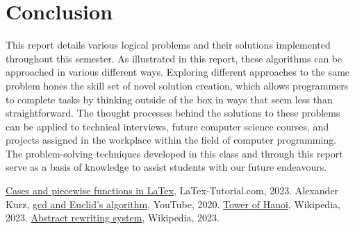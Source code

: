 \documentclass{article}
\theoremstyle{theorem}
\theoremstyle{definition}
\theoremstyle{remark}
\begin{document}
\section{Conclusion}\label{conclusions}

This report details various logical problems and their solutions implemented throughout this semester. As illustrated in this report, these algorithms can be approached in various different ways. Exploring different approaches to the same problem hones the skill set of novel solution creation, which allows programmers to complete tasks by thinking outside of the box in ways that seem less than straightforward. The thought processes behind the solutions to these problems can be applied to technical interviews, future computer science courses, and projects assigned in the workplace within the field of computer programming. The problem-solving techniques developed in this class and through this report serve as a basis of knowledge to assist students with our future endeavours. 

\begin{thebibliography}{99}
 \href{https://latex-tutorial.com/piecewise-functions-latex/}{Cases and piecewise functions in LaTex}, LaTex-Tutorial.com, 2023.
 Alexander Kurz, \href{https://www.youtube.com/watch?v=ZcJMj0antos}{gcd and Euclid's algorithm}, YouTube, 2020.
 \href{https://en.wikipedia.org/wiki/Tower_of_Hanoi}{Tower of Hanoi}, Wikipedia, 2023.
\href{https://en.wikipedia.org/wiki/Abstract_rewriting_system#:~:text=In%20a%20convergent%20ARS%2C%20every,if%20it%20is%20locally%20confluent.}{Abstract rewriting system}, Wikipedia, 2023.
\end{thebibliography}
\end{document}
